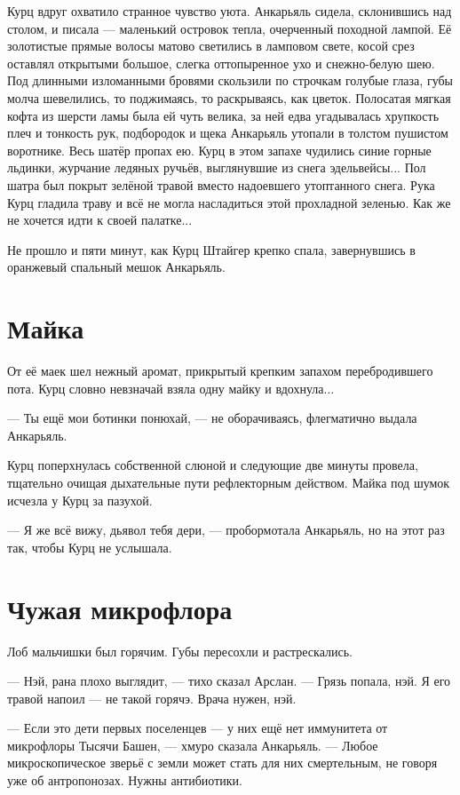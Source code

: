 \documentclass[a4paper,10pt,fleqn]{book}\usepackage{polyglossia}\setdefaultlanguage{english}\setotherlanguage{russian}\defaultfontfeatures{Ligatures=TeX,Mapping=tex-text}\usepackage{xcolor}\definecolor{lightgray}{HTML}{bbbbbb}\color{lightgray}\newcommand{\ml}[3]{\textcolor{black}{#3}}
\begin{document}
Курц вдруг охватило странное чувство уюта.
Анкарьяль сидела, склонившись над столом, и писала --- маленький островок тепла, очерченный походной лампой.
Её золотистые прямые волосы матово светились в ламповом свете, косой срез оставлял открытыми большое, слегка оттопыренное ухо и снежно-белую шею.
Под длинными изломанными  бровями скользили по строчкам голубые глаза, губы молча шевелились, то поджимаясь, то раскрываясь, как цветок.
Полосатая мягкая кофта из шерсти ламы была ей чуть велика, за ней едва угадывалась хрупкость плеч и тонкость рук, подбородок и щека Анкарьяль утопали в толстом пушистом воротнике.
Весь шатёр пропах ею.
Курц в этом запахе чудились синие горные льдинки, журчание ледяных ручьёв, выглянувшие из снега эдельвейсы...
Пол шатра был покрыт зелёной травой вместо надоевшего утоптанного снега.
Рука Курц гладила траву и всё не могла насладиться этой прохладной зеленью.
Как же не хочется идти к своей палатке...

Не прошло и пяти минут, как Курц Штайгер крепко спала, завернувшись в оранжевый спальный мешок Анкарьяль.

\section{Майка}

От её маек шел нежный аромат, прикрытый крепким запахом перебродившего пота.
Курц словно невзначай взяла одну майку и вдохнула...

--- Ты ещё мои ботинки понюхай, --- не оборачиваясь, флегматично выдала Анкарьяль.

Курц поперхнулась собственной слюной и следующие две минуты провела, тщательно очищая дыхательные пути рефлекторным действом.
Майка под шумок исчезла у Курц за пазухой.

--- Я же всё вижу, дьявол тебя дери, --- пробормотала Анкарьяль, но на этот раз так, чтобы Курц не услышала.

\section{Чужая микрофлора}

Лоб мальчишки был горячим.
Губы пересохли и растрескались.

--- Нэй, рана плохо выглядит, --- тихо сказал Арслан.
--- Грязь попала, нэй.
Я его травой напоил --- не такой горячэ.
Врача нужен, нэй.

--- Если это дети первых поселенцев --- у них ещё нет иммунитета от микрофлоры Тысячи Башен, --- хмуро сказала Анкарьяль.
--- Любое микроскопическое зверьё с земли может стать для них смертельным, не говоря уже об антропонозах.
Нужны антибиотики.
\end{document}
